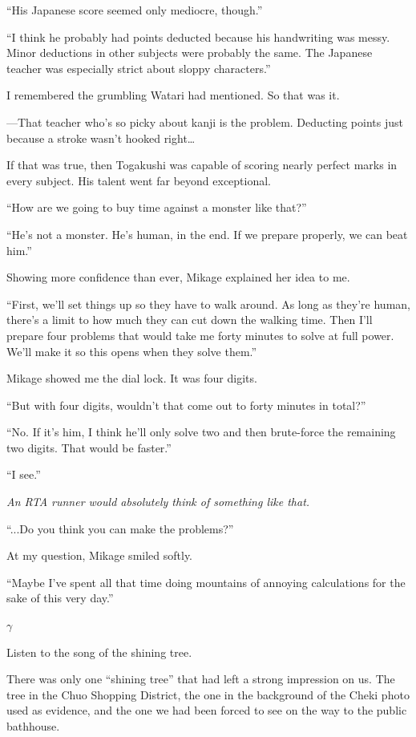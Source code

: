 \documentclass[
    a4paper,
    12pt,
    twoside,
    openany,
    UTF8,
    fontset=windows
]{ctexbook}
\begin{document}
``His Japanese score seemed only mediocre, though.''

``I think he probably had points deducted because his handwriting was messy. Minor deductions in other subjects were probably the same. The Japanese teacher was especially strict about sloppy characters.''

I remembered the grumbling Watari had mentioned. So that was it.

---That teacher who's so picky about kanji is the problem. Deducting points just because a stroke wasn't hooked right\dots

If that was true, then Togakushi was capable of scoring nearly perfect marks in every subject. His talent went far beyond exceptional.

``How are we going to buy time against a monster like that?''

``He's not a monster. He's human, in the end. If we prepare properly, we can beat him.''

Showing more confidence than ever, Mikage explained her idea to me.

``First, we'll set things up so they have to walk around. As long as they're human, there's a limit to how much they can cut down the walking time. Then I'll prepare four problems that would take me forty minutes to solve at full power. We'll make it so this opens when they solve them.''

Mikage showed me the dial lock. It was four digits.

``But with four digits, wouldn't that come out to forty minutes in total?''

``No. If it's him, I think he'll only solve two and then brute-force the remaining two digits. That would be faster.''

``I see.''

\textit{An RTA runner would absolutely think of something like that.}

``...Do you think you can make the problems?''

At my question, Mikage smiled softly.

``Maybe I've spent all that time doing mountains of annoying calculations for the sake of this very day.''

$\gamma$

Listen to the song of the shining tree.

There was only one ``shining tree'' that had left a strong impression on us. The tree in the Chuo Shopping District, the one in the background of the Cheki photo used as evidence, and the one we had been forced to see on the way to the public bathhouse.
\end{document}
